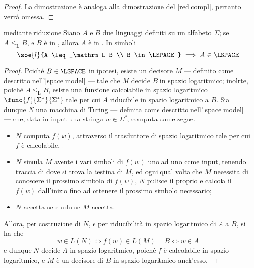 \documentclass[a4paper, 12pt]{report}
\begin{document}
    \begin{proof}
        La dimostrazione è analoga alla dimostrazione del \cref{red compl}, pertanto verrà omessa.
    \end{proof}

    \begin{framedthm}[label={l w red}]{\LSPACE mediante riduzione}
        Siano $A$ e $B$ due linguaggi definiti su un alfabeto $\Sigma$; se $A \leq_\mathrm L B$, e $B$ è in \LSPACE, allora $A$ è in \LSPACE. In simboli $$\soe{l}{A \leq_\mathrm L B \\ B \in \LSPACE} \implies A \in \LSPACE$$
    \end{framedthm}

    \begin{proof}
        Poiché $B \in \LSPACE$ in ipotesi, esiste un decisore $M$ --- definito come descritto nell'\cref{space model} --- tale che $M$ decide $B$ in spazio logaritmico; inolrte, poiché $A \leq_\mathrm L B$, esiste una funzione calcolabile in spazio logaritmico $\func{f}{\Sigma^*}{\Sigma^*}$ tale per cui $A$ riducibile in spazio logaritmico a $B$. Sia dunque $N$ una macchina di Turing --- definita come descritto nell'\cref{space model} --- che, data in input una stringa $w \in \Sigma^*$, computa come segue:

        \begin{itemize}
            \item $N$ computa $f(w)$, attraverso il trasduttore di spazio logaritmico tale per cui $f$ è calcolabile, ;
            \item $N$ simula $M$ avente i vari simboli di $f(w)$ uno ad uno come input, tenendo traccia di dove si trova la testina di $M$, ed ogni qual volta che $M$ necessita di conoscere il prossimo simbolo di $f(w)$, $N$ pulisce il proprio  e calcola il $f(w)$ dall'inizio fino ad ottenere il prossimo simbolo necessario;
            \item $N$ accetta se e solo se $M$ accetta.
        \end{itemize}

        Allora, per costruzione di $N$, e per riducibilità in spazio logaritmico di $A$ a $B$, si ha che $$w \in L(N) \iff f(w) \in L(M) = B \iff w \in A$$ e dunque $N$ decide $A$ in spazio logaritmico, poiché $f$ è calcolabile in spazio logaritmico, e $M$ è un decisore di $B$ in spazio logaritmico anch'esso.


\end{proof}
\end{document}
